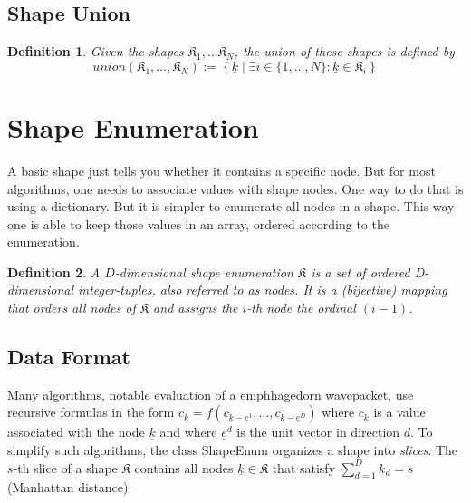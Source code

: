 \documentclass{article}
\newtheorem{definition}{Definition}
\begin{document}
\subsection{Shape Union}

\begin{definition}
Given the shapes \( \mathfrak{K}_1, \ldots \mathfrak{K}_N \), the union of these shapes
is defined by
\begin{equation}
union(\mathfrak{K}_1,\ldots,\mathfrak{K}_N) := \left\{ 
\underline{k} \mid \exists i \in \{1, \ldots, N \} \colon \underline{k} \in \mathfrak{K}_i\right\}
\end{equation}
\end{definition}

\section{Shape Enumeration}

A basic shape just tells you whether it contains a specific node. But
for most algorithms, one needs to associate values with shape nodes. One way to
do that is using a dictionary. But it is simpler to enumerate all nodes in a shape.
This way one is able to keep those values in an array, ordered according to the enumeration.

\begin{definition}
A \( D \)-dimensional shape enumeration \( \mathfrak{K} \) is a 
set of ordered D-dimensional integer-tuples, also referred to as \emph{nodes}. It is a (bijective) mapping that orders all nodes of \( \mathfrak{K} \) and assigns the \(i\)-th node the ordinal \( (i-1) \).
\end{definition}

\subsection{Data Format}
Many algorithms, notable evaluation of a emph{hagedorn wavepacket}, use recursive formulas in the form 
\( c_{\underline{k}} = f(c_{\underline{k}-\underline{e}^1}, \ldots, c_{\underline{k}-\underline{e}^D}) \)
where \( c_{\underline{k}} \) is a value associated with the node \( \underline{k} \)
and where \( \underline{e}^d \) is the unit vector in direction \( d \).
To simplify such algorithms, the class ShapeEnum organizes a shape into \emph{slices}. 
The \( s \)-th slice of a shape \( \mathfrak{K} \) contains all nodes \(
\underline{k} \in \mathfrak{K} \) that satisfy \( \sum_{d=1}^{D} k_d = s \) (Manhattan distance).
\end{document}
